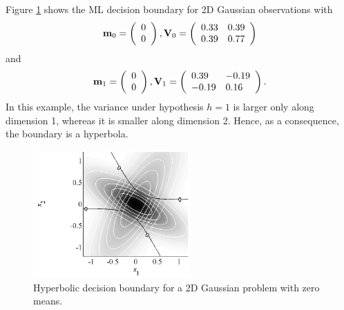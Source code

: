 \begin{example}
	Figure \ref{fig:DecGauss2Deqm2} shows the ML decision boundary for 2D Gaussian observations with
	\begin{equation*}
	{\bf m}_0 =  \left(\begin{array}{l}  0\\0   \end{array}\right), {\bf V}_0 = 
	\left(\begin{array}{ll} 0.33 & 0.39 \\ 0.39 & 0.77  \end{array} \right)
	\end{equation*}
	and
	\begin{equation*}
	{\bf m}_1 = \left(\begin{array}{l}  0\\0  \end{array}\right), {\bf V}_1 = 
	\left(\begin{array}{ll} 0.39 &-0.19 \\ -0.19 & 0.16\end{array} \right).
	\end{equation*}
	In this example, the variance under hypothesis $h=1$ is larger only along dimension 1, whereas it is smaller along dimension 2. Hence, as a consequence, the boundary is a hyperbola.
	\begin{figure}[htb]
		\begin{center}
			\includegraphics[width=6cm]{Figures/DecGauss2Deqm2.pdf}
			\caption{Hyperbolic decision boundary for a 2D Gaussian problem with zero means.}
			\label{fig:DecGauss2Deqm2}
		\end{center}
	\end{figure}
\end{example}

